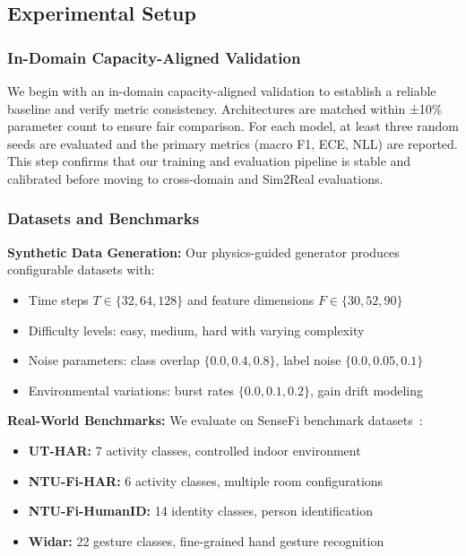 \documentclass[journal]{IEEEtran}
\begin{document}
\subsection{Experimental Setup}

\subsubsection{In-Domain Capacity-Aligned Validation}
We begin with an in-domain capacity-aligned validation to establish a reliable baseline and verify metric consistency. Architectures are matched within ±10\% parameter count to ensure fair comparison. For each model, at least three random seeds are evaluated and the primary metrics (macro F1, ECE, NLL) are reported. This step confirms that our training and evaluation pipeline is stable and calibrated before moving to cross-domain and Sim2Real evaluations.

\subsubsection{Datasets and Benchmarks}

\textbf{Synthetic Data Generation:} Our physics-guided generator produces configurable datasets with:
\begin{itemize}
\item Time steps $T \in \{32, 64, 128\}$ and feature dimensions $F \in \{30, 52, 90\}$
\item Difficulty levels: easy, medium, hard with varying complexity
\item Noise parameters: class overlap $\{0.0, 0.4, 0.8\}$, label noise $\{0.0, 0.05, 0.1\}$
\item Environmental variations: burst rates $\{0.0, 0.1, 0.2\}$, gain drift modeling
\end{itemize}

\textbf{Real-World Benchmarks:} We evaluate on SenseFi benchmark datasets~\cite{yang2023sensefi}:
\begin{itemize}
\item \textbf{UT-HAR:} 7 activity classes, controlled indoor environment
\item \textbf{NTU-Fi-HAR:} 6 activity classes, multiple room configurations
\item \textbf{NTU-Fi-HumanID:} 14 identity classes, person identification
\item \textbf{Widar:} 22 gesture classes, fine-grained hand gesture recognition
\end{itemize}
\end{document}
